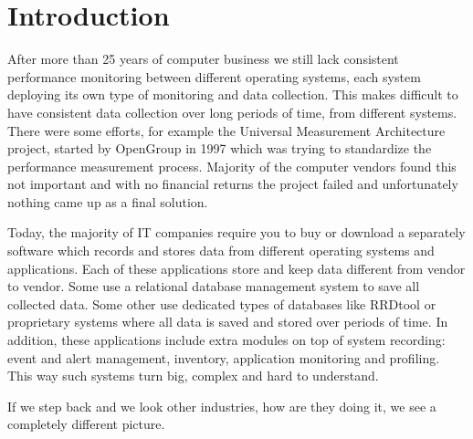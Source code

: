 
\chapter{Introduction}

\noindent
After more than 25 years of computer business we still lack consistent 
performance monitoring between different operating systems, each system 
deploying its own type of monitoring and data collection. This makes difficult 
to have consistent data collection over long periods of time, from
different systems. There were some efforts, for example the Universal Measurement 
Architecture project, started by OpenGroup in 1997 which was trying to 
standardize the performance measurement process. Majority of the computer 
vendors found this not important and with no financial returns 
the project failed and unfortunately nothing came up as a final solution.

\bigskip
\noindent
Today, the majority of IT companies require you to buy or download a 
separately software which records and stores data from different 
operating systems and applications. Each of these applications 
store and keep data different from vendor to vendor. Some 
use a relational database management system to save all collected data.
Some other use dedicated types of databases like RRDtool or proprietary 
systems where all data is saved and stored over periods of time. 
In addition, these applications include extra modules on top of system 
recording: event and alert management, inventory, application monitoring 
and profiling. This way such systems turn big, complex and hard to 
understand.

If we step back and we look other industries, how are they doing it, 
we see a completely different picture.

